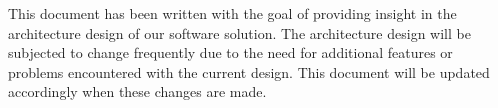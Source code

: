 This document has been written with the goal of providing insight in the architecture design of our software solution. The architecture design will be subjected to change frequently due to the need for additional features or problems encountered with the current design. This document will be updated accordingly when these changes are made.